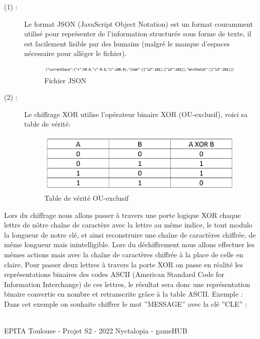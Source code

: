 \begin{description}
    \item[(1) :] Le format JSON (JavaScript Object Notation) est un format couramment utilisé pour représenter de l’information structurée sous forme de texte, il est facilement lisible par des humains (malgré le manque d’espaces nécessaire pour alléger le fichier).
    \begin{figure}[H]
        \centering
        \includegraphics[width=18cm]{img/gameplay/JSONRaw.PNG}
        \caption{ Fichier JSON}
        \label{fig:JSONraw}
    \end{figure}
    \item[(2) :] Le chiffrage XOR utilise l’opérateur binaire XOR (OU-exclusif), voici sa table de vérité:
    \newline
    \begin{figure}[H]
        \centering
        \includegraphics[width=10cm]{img/gameplay/XORtable.PNG}
        \caption{ Table de vérité OU-exclusif}
        \label{fig:XORtable}
    \end{figure}
\end{description}
\par
Lors du chiffrage nous allons passer à travers une porte logique XOR chaque lettre de nôtre chaîne de caractère avec la lettre au même indice, le tout modulo la longueur de notre clé, et ainsi reconstruire une chaîne de caractères chiffrée, de même longueur mais inintelligible.
Lors du déchiffrement nous allons effectuer les mêmes actions mais avec la chaîne de caractères chiffrée à la place de celle en claire.
Pour passer deux lettres à travers la porte XOR on passe en réalité les représentations binaires des codes ASCII (American Standard Code for Information Interchange) de ces lettres, le résultat sera donc une représentation binaire convertie en nombre et retranscrite grâce à la table ASCII.
Exemple : 
Dans cet exemple on souhaite chiffrer le mot ''MESSAGE'' avec la clé ''CLE'' :

\vfill
\noindent\makebox[\linewidth]{\rule{.8\paperwidth}{.6pt}}\\[0.2cm]
EPITA Toulouse - Projet S2 - 2022 \hfill Nyctalopia - gameHUB
\noindent\makebox[\linewidth]{\rule{.8\paperwidth}{.6pt}}

